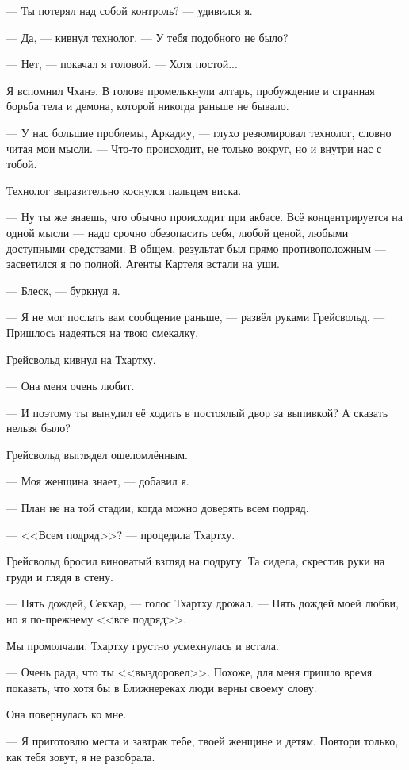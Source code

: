 --- Ты потерял над собой контроль? --- удивился я.

--- Да, --- кивнул технолог.
--- У тебя подобного не было?

--- Нет, --- покачал я головой.
--- Хотя постой...

Я вспомнил Чханэ.
В голове промелькнули алтарь, пробуждение и странная борьба тела и демона, которой никогда раньше не бывало.

--- У нас большие проблемы, Аркадиу, --- глухо резюмировал технолог, словно читая мои мысли.
--- Что-то происходит, не только вокруг, но и внутри нас с тобой.

Технолог выразительно коснулся пальцем виска.

--- Ну ты же знаешь, что обычно происходит при акбасе.
Всё концентрируется на одной мысли --- надо срочно обезопасить себя, любой ценой, любыми доступными средствами.
В общем, результат был прямо противоположным --- засветился я по полной.
Агенты Картеля встали на уши.

--- Блеск, --- буркнул я.

--- Я не мог послать вам сообщение раньше, --- развёл руками Грейсвольд.
--- Пришлось надеяться на твою смекалку.

Грейсвольд кивнул на Тхартху.

--- Она меня очень любит.

--- И поэтому ты вынудил её ходить в постоялый двор за выпивкой?
А сказать нельзя было?

Грейсвольд выглядел ошеломлённым.

--- Моя женщина знает, --- добавил я.

--- План не на той стадии, когда можно доверять всем подряд.

--- <<Всем подряд>>? --- процедила Тхартху.

Грейсвольд бросил виноватый взгляд на подругу.
Та сидела, скрестив руки на груди и глядя в стену.

--- Пять дождей, Секхар, --- голос Тхартху дрожал.
--- Пять дождей моей любви, но я по-прежнему <<все подряд>>.

Мы промолчали.
Тхартху грустно усмехнулась и встала.

--- Очень рада, что ты <<выздоровел>>.
Похоже, для меня пришло время показать, что хотя бы в Ближнереках люди верны своему слову.

Она повернулась ко мне.

--- Я приготовлю места и завтрак тебе, твоей женщине и детям.
Повтори только, как тебя зовут, я не разобрала.

